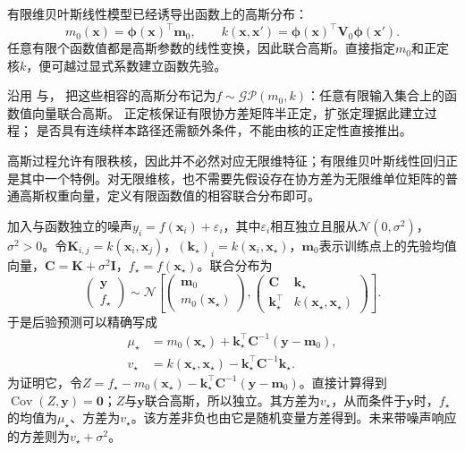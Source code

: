 有限维贝叶斯线性模型已经诱导出函数上的高斯分布：
\[
  m_0(\bm{x})=\bm{\phi}(\bm{x})^{\top}\bm{m}_0,\qquad
  k(\bm{x},\bm{x}')=\bm{\phi}(\bm{x})^{\top}\bm{V}_0\bm{\phi}(\bm{x}').
\]
任意有限个函数值都是高斯参数的线性变换，因此联合高斯。直接指定$m_0$和正定核$k$，便可越过显式系数建立函数先验。

沿用
与，
把这些相容的高斯分布记为$f\sim\mathcal{GP}(m_0,k)$：任意有限输入集合上的函数值向量联合高斯。
正定核保证有限协方差矩阵半正定，扩张定理据此建立过程；
是否具有连续样本路径还需额外条件，不能由核的正定性直接推出。

高斯过程允许有限秩核，因此并不必然对应无限维特征；有限维贝叶斯线性回归正是其中一个特例。对无限维核，也不需要先假设存在协方差为无限维单位矩阵的普通高斯权重向量，定义有限函数值的相容联合分布即可。

加入与函数独立的噪声$y_i=f(\bm{x}_i)+\varepsilon_i$，其中$\varepsilon_i$相互独立且服从$\mathcal{N}(0,\sigma^2)$，$\sigma^2>0$。令$\bm{K}_{i,j}=k(\bm{x}_i,\bm{x}_j)$，$(\bm{k}_{\star})_i=k(\bm{x}_i,\bm{x}_{\star})$，$\bm{m}_0$表示训练点上的先验均值向量，$\bm{C}=\bm{K}+\sigma^2\bm{I}$，$f_{\star}=f(\bm{x}_{\star})$。联合分布为
\[
  \begin{pmatrix}\bm{y}\\f_{\star}\end{pmatrix}
  \sim\mathcal{N}\!\left[
    \begin{pmatrix}\bm{m}_0\\m_0(\bm{x}_{\star})\end{pmatrix},
    \begin{pmatrix}
      \bm{C}&\bm{k}_{\star}\\
      \bm{k}_{\star}^{\top}&k(\bm{x}_{\star},\bm{x}_{\star})
    \end{pmatrix}\right].
\]
于是后验预测可以精确写成
\begin{equation}
  \begin{aligned}
    \mu_{\star}
      &=m_0(\bm{x}_{\star})
        +\bm{k}_{\star}^{\top}\bm{C}^{-1}(\bm{y}-\bm{m}_0),\\
    v_{\star}
      &=k(\bm{x}_{\star},\bm{x}_{\star})
        -\bm{k}_{\star}^{\top}\bm{C}^{-1}\bm{k}_{\star}.
  \end{aligned}
  \label{eq:regression-gp-posterior}
\end{equation}
为证明它，令$Z=f_{\star}-m_0(\bm{x}_{\star})-\bm{k}_{\star}^{\top}\bm{C}^{-1}(\bm{y}-\bm{m}_0)$。直接计算得到$\operatorname{Cov}(Z,\bm{y})=\bm{0}$；$Z$与$\bm{y}$联合高斯，所以独立。其方差为$v_{\star}$，从而条件于$\bm{y}$时，$f_{\star}$的均值为$\mu_{\star}$、方差为$v_{\star}$。该方差非负也由它是随机变量方差得到。未来带噪声响应的方差则为$v_{\star}+\sigma^2$。

